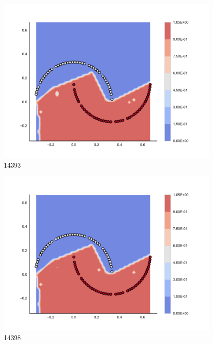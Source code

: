 \begin{subfigure}[b]{0.09\textwidth}
    \includegraphics[clip, trim=2.35cm 1.75cm 4.5cm 0cm,width=\textwidth]{img/convergence/14393.pdf}
    \caption{14393}
    \label{fig:convergence_14393}
\end{subfigure}
%
\begin{subfigure}[b]{0.09\textwidth}
    \includegraphics[clip, trim=2.35cm 1.75cm 4.5cm 0cm,width=\textwidth]{img/convergence/14398.pdf}
    \caption{14398}
    \label{fig:convergence_14398}
\end{subfigure}
%
